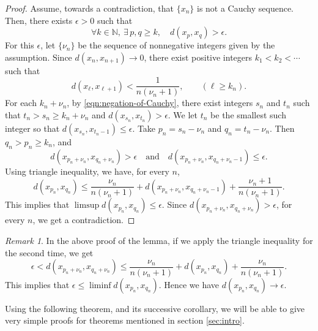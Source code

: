 \documentclass[a4paper,10pt,twoside,reqno]{amsart}
\theoremstyle{definition}
\theoremstyle{remark}
\newtheorem*{rem}{Remark}
\newcommand{\set}[1]{\{#1\}}
\newcommand{\e}{\epsilon}
\newcommand{\N}{\mathbb{N}}
\numberwithin{equation}{section}
\begin{document}
\begin{proof}
  Assume, towards a contradiction, that $\set{x_n}$ is not a Cauchy sequence.
  Then, there exists $\e>0$ such that
  \begin{equation}\label{eqn:negation-of-Cauchy}
    \forall k\in\N,\ \exists\, p,q\geq k,
    \quad d(x_p,x_q)>\e.
  \end{equation}
  For this $\e$, let $\{\nu_n\}$ be the sequence of
  nonnegative integers given by the assumption.
  Since $d(x_n,x_{n+1})\to0$, there exist positive integers $k_1<k_2<\dotsb$ such that
  \[
    d(x_\ell,x_{\ell+1})<\frac1{n(\nu_n+1)}, \qquad (\ell\geq k_n).
  \]
  For each $k_n+\nu_n$, by \eqref{eqn:negation-of-Cauchy}, there exist
  integers $s_n$ and $t_n$ such that $t_n>s_n\geq k_n+\nu_n$ and
  $d(x_{s_n},x_{t_n})>\e$. We let $t_n$ be the smallest such integer
  so that $d(x_{s_n},x_{t_n-1})\leq\e$.
  Take $p_n=s_n-\nu_n$ and $q_n=t_n-\nu_n$. Then $q_n>p_n \geq k_n$, and
  \[
    d(x_{p_n+\nu_n},x_{q_n+\nu_n})>\e
    \quad \text{and} \quad
    d(x_{p_n+\nu_n},x_{q_n+\nu_n-1}) \leq \e.
  \]
  Using triangle inequality, we have, for every $n$,
  \begin{equation*}
    d(x_{p_n},x_{q_n})
    \leq \frac{\nu_n}{n(\nu_n+1)}+d(x_{p_n+\nu_n},x_{q_n+\nu_n-1}) +\frac{\nu_n+1}{n(\nu_n+1)}.
  \end{equation*}
  This implies that $\limsup d(x_{p_n},x_{q_n}) \leq \e$. Since
  $d(x_{p_n+\nu_n},x_{q_n+\nu_n})>\e$, for every $n$,
  we get a contradiction.
\end{proof}

\begin{rem}
  In the above proof of the lemma, if we
  apply the triangle inequality for the second time, we get
  \[
    \e < d(x_{p_n+\nu_n},x_{q_n+\nu_n})
     \leq \frac{\nu_n}{n(\nu_n+1)}+d(x_{p_n},x_{q_n}) +\frac{\nu_n}{n(\nu_n+1)}.
  \]
  This implies that $\e\leq\liminf d(x_{p_n},x_{q_n})$.
  Hence we have $d(x_{p_n},x_{q_n})\to\e$.
\end{rem}

Using the following theorem, and its successive corollary, we will be able to give
very simple proofs for theorems mentioned in section \ref{sec:intro}.
\end{document}
